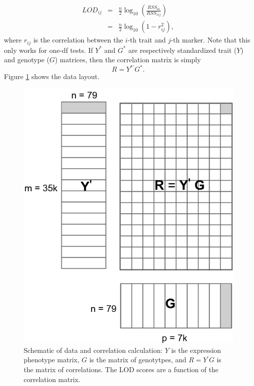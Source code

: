 \documentclass[9pt,twocolumn,twoside,lineno]{gsag3jnl}
\begin{document}
\begin{eqnarray*}
	LOD_{ij} &=& \frac{n}{2} \log_{10} \left( \frac{RSS_{0i}}{RSS_{1ij}} \right)\\
	&=& \frac{n}{2} \log_{10} \left( 1{-}r_{ij}^2 \right),
\end{eqnarray*}
where $r_{ij}$ is the correlation between the $i$-th trait and
$j$-th marker. Note that this only works for one-df tests.  If $Y^{\ast}$ and $G^{\ast}$ are respectively standardized 
trait ($Y$) and genotype ($G$) matrices, then the
correlation matrix is simply $$R=Y ^{\ast '}G^{\ast}.$$
Figure \ref{MatrixMult} shows the data layout.
      \begin{figure}[!htb]
	
	\caption{Schematic of data and correlation calculation: $Y$ is
		the expression phenotype matrix, $G$ is the matrix of
		genotytpes, and $R=Y^{\prime}G$ is the matrix of
		correlations.  The LOD scores are a function of the
		correlation matrix.}
	\label{MatrixMult}
	\includegraphics[scale = .4]{figs/YGmatrix.png}
\end{figure}    
\end{document}
